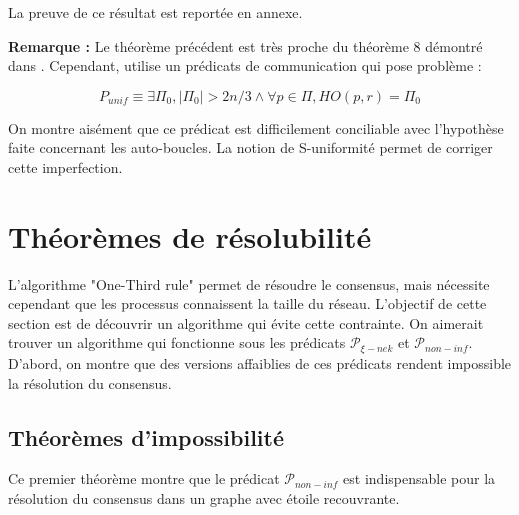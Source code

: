 \documentclass{article}
\begin{document}
La preuve de ce résultat est reportée en annexe.

\textbf{Remarque :} Le théorème précédent est très proche du théorème 8 démontré dans \cite{model_ho}.
Cependant, \cite{model_ho} utilise un prédicats de communication qui pose problème :

$$P_{unif} \equiv \exists \Pi_0, |\Pi_0| > 2n/3 \wedge \forall p \in \Pi, HO(p, r) = \Pi_0$$

On montre aisément que ce prédicat est difficilement conciliable avec l'hypothèse faite concernant les auto-boucles.
La notion de S-uniformité permet de corriger cette imperfection.

\section{Théorèmes de résolubilité}

L'algorithme "One-Third rule" permet de résoudre le consensus, mais nécessite cependant que les processus connaissent la taille du réseau.
L'objectif de cette section est de découvrir un algorithme qui évite cette contrainte.
On aimerait trouver un algorithme qui fonctionne sous les prédicats $\mathcal{P}_{\xi-nek}$ et $\mathcal{P}_{non-inf}$.
D'abord, on montre que des versions affaiblies de ces prédicats rendent impossible la résolution du consensus.

\subsection{Théorèmes d'impossibilité}

Ce premier théorème montre que le prédicat $\mathcal{P}_{non-inf}$ est indispensable pour la résolution du consensus dans un graphe avec étoile recouvrante.
\end{document}
